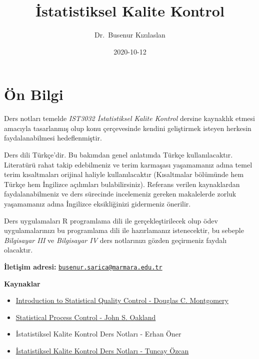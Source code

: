 \documentclass[
]{book}
\title{İstatistiksel Kalite Kontrol}
\author{Dr.~Busenur Kızılaslan}
\date{2020-10-12}
\begin{document}
\maketitle

{
\setcounter{tocdepth}{1}
\tableofcontents
}
\hypertarget{uxf6n-bilgi}{%
\chapter{Ön Bilgi}\label{uxf6n-bilgi}}

Ders notları temelde \emph{IST3032 İstatistiksel Kalite Kontrol} dersine kaynaklık etmesi amacıyla tasarlanmış olup konu çerçevesinde kendini geliştirmek isteyen herkesin faydalanabilmesi hedeflenmiştir.

Ders dili Türkçe'dir. Bu bakımdan genel anlatımda Türkçe kullanılacaktır. Literatürü rahat takip edebilmeniz ve terim karmaşası yaşamamanız adına temel terim kısaltmaları orijinal haliyle kullanılacaktır (Kısaltmalar bölümünde hem Türkçe hem İngilizce açılımları bulabilirsiniz). Referans verilen kaynaklardan faydalanabilmeniz ve ders sürecinde incelemeniz gereken makalelerde zorluk yaşamamanız adına İngilizce eksikliğinizi gidermeniz önerilir.

Ders uygulamaları R programlama dili ile gerçekleştirilecek olup ödev uygulamalarınızı bu programlama dili ile hazırlamanız istenecektir, bu sebeple \emph{Bilgisayar III} ve \emph{Bilgisayar IV} ders notlarınızı gözden geçirmeniz faydalı olacaktır.

\textbf{İletişim adresi:} \href{mailto:busenur.sarica@marmara.edu.tr}{\nolinkurl{busenur.sarica@marmara.edu.tr}}

\textbf{Kaynaklar}

\begin{itemize}
\item
  \href{http://endustri.eskisehir.edu.tr/ipoyraz/TKY302/icerik/text\%20book_montgomery_6th\%20edition.pdf}{Introduction to Statistical Quality Control - Douglas C. Montgomery}
\item
  \href{http://www.diliev.com/Home/materiali/KHEA/referati/6812268-Statistical-Process-Control-eBook-VG.pdf}{Statistical Process Control - John S. Oakland}
\item
  İstatistiksel Kalite Kontrol Ders Notları - Erhan Öner
\item
  \href{http://auzefkitap.istanbul.edu.tr/kitap/endustrimuhlt_ue/istatistikselkalitekontrolu.pdf}{İstatistiksel Kalite Kontrol Ders Notları - Tuncay Özcan}
\end{itemize}
\end{document}

